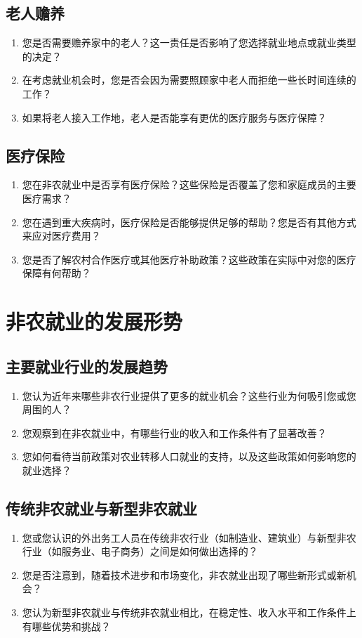 \documentclass[12pt]{article}
\begin{document}
\subsection*{老人赡养}
\begin{enumerate}
    \item 您是否需要赡养家中的老人？这一责任是否影响了您选择就业地点或就业类型的决定？
    \item 在考虑就业机会时，您是否会因为需要照顾家中老人而拒绝一些长时间连续的工作？
    \item 如果将老人接入工作地，老人是否能享有更优的医疗服务与医疗保障？
\end{enumerate}

\subsection*{医疗保险}
\begin{enumerate}
    \item 您在非农就业中是否享有医疗保险？这些保险是否覆盖了您和家庭成员的主要医疗需求？
    \item 您在遇到重大疾病时，医疗保险是否能够提供足够的帮助？您是否有其他方式来应对医疗费用？
    \item 您是否了解农村合作医疗或其他医疗补助政策？这些政策在实际中对您的医疗保障有何帮助？
\end{enumerate}

\section{非农就业的发展形势}

\subsection*{主要就业行业的发展趋势}
\begin{enumerate}
    \item 您认为近年来哪些非农行业提供了更多的就业机会？这些行业为何吸引您或您周围的人？
    \item 您观察到在非农就业中，有哪些行业的收入和工作条件有了显著改善？
    \item 您如何看待当前政策对农业转移人口就业的支持，以及这些政策如何影响您的就业选择？
\end{enumerate}

\subsection*{传统非农就业与新型非农就业}
\begin{enumerate}
    \item 您或您认识的外出务工人员在传统非农行业（如制造业、建筑业）与新型非农行业（如服务业、电子商务）之间是如何做出选择的？
    \item 您是否注意到，随着技术进步和市场变化，非农就业出现了哪些新形式或新机会？
    \item 您认为新型非农就业与传统非农就业相比，在稳定性、收入水平和工作条件上有哪些优势和挑战？
\end{enumerate}
\end{document}
